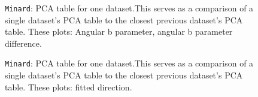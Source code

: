 \documentclass[12pt]{article}
\begin{document}
\begin{figure}
\centering
\noindent{}
  \caption{\centering \texttt{Minard}: PCA table for one dataset.\hspace{\textwidth}This serves as a comparison of a single dataset's PCA table to the closest previous dataset's PCA table. These plots: Angular b parameter, angular b parameter difference.}
  \label{fig:tab3}
\end{figure}

\begin{figure}
\centering
\noindent{}
  \caption{\centering \texttt{Minard}: PCA table for one dataset.\hspace{\textwidth}This serves as a comparison of a single dataset's PCA table to the closest previous dataset's PCA table. These plots: fitted direction.}
  \label{fig:tab4}
\end{figure}
\end{document}
